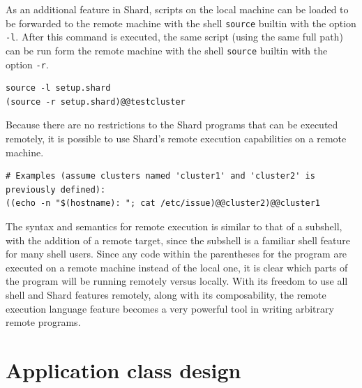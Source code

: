 \documentclass[twoside]{report}
\begin{document}
As an additional feature in Shard, scripts on the local machine can be loaded to be forwarded to the remote machine with the shell \texttt{source} builtin with the option \texttt{-l}.
After this command is executed, the same script (using the same full path) can be run form the remote machine with the shell \texttt{source} builtin with the option \texttt{-r}.

\begin{minipage}[c]{\textwidth-15pt}
  \begin{lstlisting}[language=Shard]
source -l setup.shard
(source -r setup.shard)@@testcluster
\end{lstlisting}
  \smallskip
\end{minipage}

Because there are no restrictions to the Shard programs that can be executed remotely, it is possible to use Shard's remote execution capabilities on a remote machine.

\begin{minipage}[c]{\textwidth-15pt}
  \begin{lstlisting}[language=Shard]
# Examples (assume clusters named 'cluster1' and 'cluster2' is previously defined):
((echo -n "$(hostname): "; cat /etc/issue)@@cluster2)@@cluster1
\end{lstlisting}
  \smallskip
\end{minipage}

The syntax and semantics for remote execution is similar to that of a subshell, with the addition of a remote target, since the subshell is a familiar shell feature for many shell users.
Since any code within the parentheses for the program are executed on a remote machine instead of the local one, it is clear which parts of the program will be running remotely versus locally.
With its freedom to use all shell and Shard features remotely, along with its composability, the remote execution language feature becomes a very powerful tool in writing arbitrary remote programs.


\section{Application class design}

\end{document}
